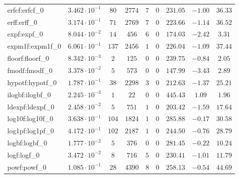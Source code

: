 \begin{tabular}{|l|c|c|c|c|c|c|c|c|}
erfcf:erfcf\_0               & $ 3.462 \cdot 10^{-1} $ & $ 80     $ & $ 2774  $ & $ 7   $ & $ 0   $ & $ 231.05      $ & $ -1.00   $ & $ 36.33   $ \\
erff:erff\_0                 & $ 3.174 \cdot 10^{-1} $ & $ 71     $ & $ 2769  $ & $ 7   $ & $ 0   $ & $ 223.66      $ & $ -1.14   $ & $ 36.52   $ \\
expf:expf\_0                 & $ 8.044 \cdot 10^{-2} $ & $ 14     $ & $ 456   $ & $ 6   $ & $ 0   $ & $ 174.03      $ & $ -2.42   $ & $ 3.31    $ \\
expm1f:expm1f\_0             & $ 6.061 \cdot 10^{-1} $ & $ 137    $ & $ 2456  $ & $ 1   $ & $ 0   $ & $ 226.04      $ & $ -1.09   $ & $ 37.44   $ \\
floorf:floorf\_0             & $ 8.342 \cdot 10^{-3} $ & $ 2      $ & $ 125   $ & $ 0   $ & $ 0   $ & $ 239.75      $ & $ -0.84   $ & $ 2.05    $ \\
fmodf:fmodf\_0               & $ 3.378 \cdot 10^{-2} $ & $ 5      $ & $ 573   $ & $ 0   $ & $ 0   $ & $ 147.99      $ & $ -3.43   $ & $ 2.89    $ \\
hypotf:hypotf\_0             & $ 1.787 \cdot 10^{-1} $ & $ 38     $ & $ 2298  $ & $ 3   $ & $ 0   $ & $ 212.63      $ & $ -1.37   $ & $ 25.21   $ \\
ilogbf:ilogbf\_0             & $ 2.245 \cdot 10^{-3} $ & $ 1      $ & $ 22    $ & $ 0   $ & $ 0   $ & $ 445.43      $ & $ 1.09    $ & $ 1.96    $ \\
ldexpf:ldexpf\_0             & $ 2.458 \cdot 10^{-2} $ & $ 5      $ & $ 751   $ & $ 1   $ & $ 0   $ & $ 203.42      $ & $ -1.59   $ & $ 17.64   $ \\
log10f:log10f\_0             & $ 3.638 \cdot 10^{-1} $ & $ 104    $ & $ 1824  $ & $ 1   $ & $ 0   $ & $ 285.88      $ & $ -0.17   $ & $ 30.58   $ \\
log1pf:log1pf\_0             & $ 4.172 \cdot 10^{-1} $ & $ 102    $ & $ 2187  $ & $ 1   $ & $ 0   $ & $ 244.50      $ & $ -0.76   $ & $ 28.79   $ \\
logbf:logbf\_0               & $ 1.777 \cdot 10^{-2} $ & $ 5      $ & $ 376   $ & $ 0   $ & $ 0   $ & $ 281.45      $ & $ -0.22   $ & $ 10.24   $ \\
logf:logf\_0                 & $ 3.472 \cdot 10^{-2} $ & $ 8      $ & $ 716   $ & $ 5   $ & $ 0   $ & $ 230.41      $ & $ -1.01   $ & $ 11.79   $ \\
powf:powf\_0                 & $ 1.085 \cdot 10^{-1} $ & $ 28     $ & $ 4390  $ & $ 8   $ & $ 0   $ & $ 258.13      $ & $ -0.54   $ & $ 44.69   $ \\

\end{tabular}

